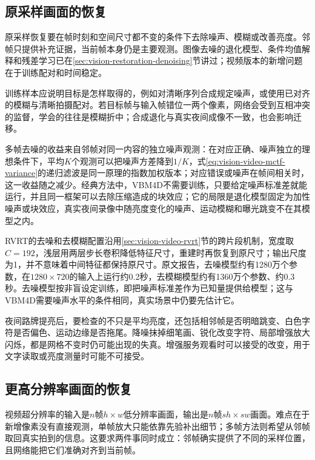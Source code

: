 \subsection{原采样画面的恢复}
\label{sec:vision-video-native-restoration}

原采样恢复要在帧时刻和空间尺寸都不变的条件下去除噪声、模糊或改善亮度。邻帧只提供补充证据，当前帧本身仍是主要观测。图像去噪的退化模型、条件均值解释和残差学习已在\ref{sec:vision-restoration-denoising}节讲过；视频版本的新增问题在于训练配对和时间稳定。

训练样本应说明目标是怎样取得的，例如对清晰序列合成规定噪声，或使用已对齐的模糊与清晰拍摄配对。若目标帧与输入帧错位一两个像素，网络会受到互相冲突的监督，学会的往往是模糊折中；合成退化与真实夜间成像不一致，也会影响迁移。

多帧去噪的收益来自邻帧对同一内容的独立噪声观测：在对应正确、噪声独立的理想条件下，平均$K$个观测可以把噪声方差降到$1/K$，式\eqref{eq:vision-video-mctf-variance}的递归滤波是同一原理的指数加权版本；对应错误或噪声在帧间相关时，这一收益随之减少。经典方法中，VBM4D不需要训练，只要给定噪声标准差就能运行，并且同一框架可以去除压缩造成的块效应；它的局限是退化模型固定为加性噪声或块效应，真实夜间录像中随亮度变化的噪声、运动模糊和曝光跳变不在其模型之内。

RVRT的去噪和去模糊配置沿用\ref{sec:vision-video-rvrt}节的跨片段机制，宽度取$C=192$，浅层用两层步长卷积降低特征尺寸，重建时再恢复到原尺寸；输出尺度为1，并不意味着中间特征都保持原尺寸。原文报告，去噪模型约有1280万个参数，在$1280\times720$的输入上运行约0.2秒，去模糊模型约有1360万个参数、约0.3秒。去噪模型按非盲设定训练，即把噪声标准差作为已知量提供给模型；这与VBM4D需要噪声水平的条件相同，真实场景中仍要先估计它。

夜间路牌提亮后，要检查的不只是平均亮度，还包括相邻帧是否明暗跳变、白色字符是否偏色、运动边缘是否拖尾。降噪抹掉细笔画、锐化改变字符、局部增强放大闪烁，都是网格不变时仍可能出现的失真。增强服务观看时可以接受的改变，用于文字读取或亮度测量时可能不可接受。

\subsection{更高分辨率画面的恢复}
\label{sec:vision-video-super-resolution}
\label{sec:vision-video-basicvsr}

视频超分辨率的输入是$n$帧$h\times w$低分辨率画面，输出是$n$帧$sh\times sw$画面。难点在于新增像素没有直接观测，单帧放大只能依靠先验补出细节；多帧方法则希望从邻帧取回真实拍到的信息。这要求两件事同时成立：邻帧确实提供了不同的采样位置，且网络能把它们准确对齐到当前帧。

